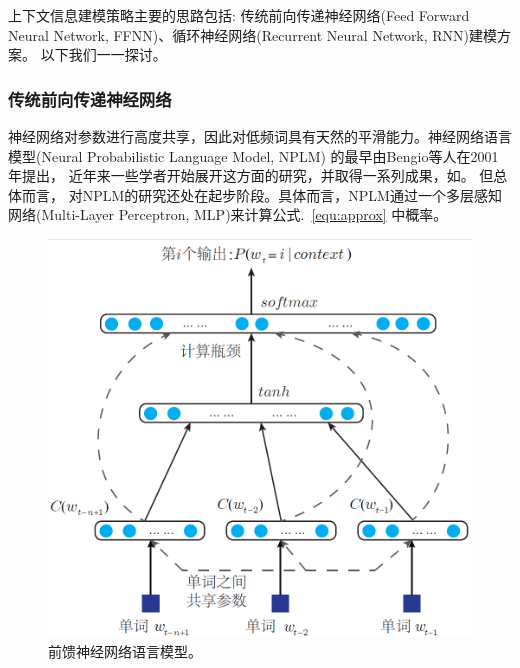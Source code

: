 \documentclass[master,openright,twoside,color]{buaathesis}
\begin{document}
上下文信息建模策略主要的思路包括: 传统前向传递神经网络(Feed Forward Neural Network, FFNN)、循环神经网络(Recurrent Neural Network, RNN)建模方案。 以下我们一一探讨。


\subsubsection{传统前向传递神经网络}
神经网络对参数进行高度共享，因此对低频词具有天然的平滑能力。神经网络语言模型(Neural Probabilistic Language Model, NPLM) 的最早由Bengio等人在2001年提出\cite{DBLP:conf/nips/BengioDV00}， 近年来一些学者开始展开这方面的研究，并取得一系列成果，如\cite{DBLP:conf/acl/BaroniDK14,DBLP:journals/sigkdd/BellK07,DBLP:journals/pami/BengioCV13,DBLP:journals/tnn/BengioSF94}。 但总体而言， 对NPLM的研究还处在起步阶段。具体而言，NPLM通过一个多层感知网络(Multi-Layer Perceptron, MLP)来计算公式.~\ref{equ:approx} 中概率。
\begin{figure}
  \centering
  \includegraphics[width=0.68\linewidth]{./figures/nplm2.png}
  \caption{前馈神经网络语言模型。}\label{fig:nplm}
\end{figure}
\end{document}
